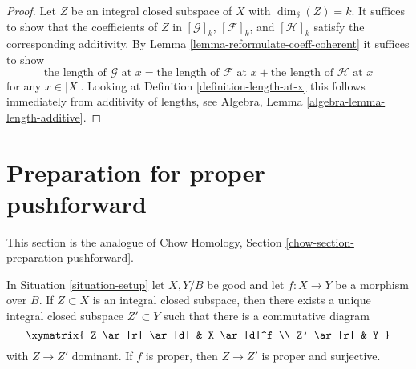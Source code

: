 \begin{proof}
Let $Z$ be an integral closed subspace of $X$ with $\dim_\delta(Z) = k$.
It suffices to show that the coefficients of
$Z$ in $[\mathcal{G}]_k$, $[\mathcal{F}]_k$, and $[\mathcal{H}]_k$
satisfy the corresponding additivity. By
Lemma \ref{lemma-reformulate-coeff-coherent}
it suffices to show
$$
\text{the length of }\mathcal{G}\text{ at }x =
\text{the length of }\mathcal{F}\text{ at }x +
\text{the length of }\mathcal{H}\text{ at }x
$$
for any $x \in |X|$. Looking at Definition \ref{definition-length-at-x}
this follows immediately from additivity of lengths, see
Algebra, Lemma \ref{algebra-lemma-length-additive}.
\end{proof}





\section{Preparation for proper pushforward}
\label{section-preparation-pushforward}

\noindent
This section is the analogue of
Chow Homology, Section \ref{chow-section-preparation-pushforward}.

\begin{lemma}
\label{lemma-proper-image}
In Situation \ref{situation-setup} let $X,Y/B$ be good and let $f : X \to Y$
be a morphism over $B$. If $Z \subset X$ is an integral closed subspace, then
there exists a unique integral closed subspace $Z' \subset Y$ such that there
is a commutative diagram
$$
\xymatrix{
Z \ar[r] \ar[d] & X \ar[d]^f \\
Z' \ar[r] & Y
}
$$
with $Z \to Z'$ dominant. If $f$ is proper, then $Z \to Z'$ is proper
and surjective.
\end{lemma}

















